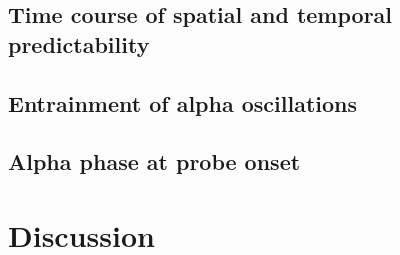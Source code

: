 \documentclass[dwyatte_dissertation.tex]{subfiles}
\begin{document}

\subsection{Time course of spatial and temporal predictability}



\subsection{Entrainment of alpha oscillations}


\subsection{Alpha phase at probe onset}

\section{Discussion}



\end{document}
